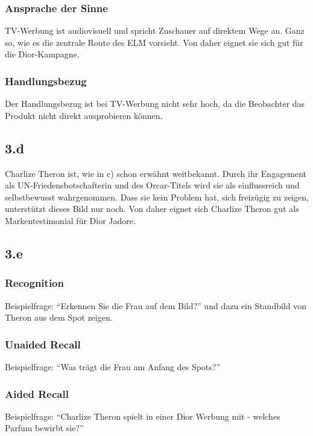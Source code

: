 \documentclass{article}
\begin{document}
\subsubsection{Ansprache der Sinne}
TV-Werbung ist audiovisuell und spricht Zuschauer auf direktem Wege an. Ganz so, wie es die zentrale Route des ELM vorsieht. Von daher eignet sie sich gut für die Dior-Kampagne.
\subsubsection{Handlungsbezug}
Der Handlungsbezug ist bei TV-Werbung nicht sehr hoch, da die Beobachter das Produkt nicht direkt ausprobieren können.

\subsection{3.d}
Charlize Theron ist, wie in c) schon erwähnt weitbekannt. Durch ihr Engagement als UN-Friedensbotschafterin und des Orcar-Titels wird sie als einflussreich und selbstbewusst wahrgenommen. Dass sie kein Problem hat, sich freizügig zu zeigen, unterstützt dieses Bild nur noch.
Von daher eignet sich Charlize Theron gut als Markentestimonial für Dior Jadore.

\subsection{3.e}
\subsubsection{Recognition}
Beispielfrage: "`Erkennen Sie die Frau auf dem Bild?"' und dazu ein Standbild von Theron aus dem Spot zeigen.
\subsubsection{Unaided Recall}
Beispielfrage: "`Was trägt die Frau am Anfang des Spots?"'
\subsubsection{Aided Recall}
Beispielfrage: "`Charlize Theron spielt in einer Dior Werbung mit - welches Parfum bewirbt sie?"'
\end{document}
